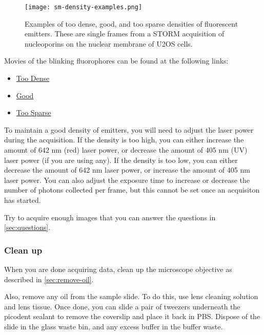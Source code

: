 \documentclass[10pt,a4paper,oneside]{book}
\begin{document}
\begin{figure}[ht]
    \centering
    \texttt{[image: sm-density-examples.png]}
    \caption{Examples of too dense, good, and too sparse densities of fluorescent emitters. These are single frames from a STORM acquisition of nucleoporins on the nuclear membrane of U2OS cells.}
    \label{fig:good-vs-bad-density}
\end{figure}

Movies of the blinking fluorophores can be found at the following links:

\begin{itemize}
    \item \href{https://drive.google.com/file/d/12zIK-BqMl0qttkYljKi7P9xZ3krMvthe/view?usp=sharing}{Too Dense}
    \item \href{https://drive.google.com/file/d/1Is4U-K297sku4u20OJqwY6IOUags1bLl/view?usp=sharing}{Good}
    \item \href{https://drive.google.com/file/d/1W2AxVjYirPj8t8d2__m8rNoNTUyM3RfY/view?usp=sharing}{Too Sparse}
\end{itemize}

To maintain a good density of emitters, you will need to adjust the laser power during the acquisition. If the density is too high, you can either increase the amount of 642 nm (red) laser power, or decrease the amount of 405 nm (UV) laser power (if you are using any). If the density is too low, you can either decrease the amount of 642 nm laser power, or increase the amount of 405 nm laser power. You can also adjust the exposure time to increase or decrease the number of photons collected per frame, but this cannot be set once an acquisiton has started.

Try to acquire enough images that you can answer the questions in \autoref{sec:questions}.

\subsubsection{Clean up}

\newline

When you are done acquiring data, clean up the microscope objective as described in \autoref{sec:remove-oil}.

Also, remove any oil from the sample slide. To do this, use lens cleaning solution and lens tissue. Once done, you can slide a pair of tweezers underneath the picodent sealant to remove the coverslip and place it back in PBS. Dispose of the slide in the glass waste bin, and any excess buffer in the buffer waste.
\end{document}
